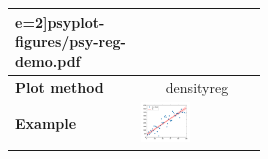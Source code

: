 \documentclass[
11pt, %
english, %
singlespacing, %
headsepline, %
]{MastersDoctoralThesis} %
\begin{document}
\begin{NoHyper}
\begin{refsection}
\begin{subappendices}
\begin{tabular}{l|p{0.25\linewidth}|p{0.25\linewidth}|}
e=2]{psyplot-figures/psy-reg-demo.pdf} \\
			\midrule
			\midrule
			\textbf{Plot method} & \multicolumn{2}{c|}{densityreg} \\
			\hline
			\textbf{Example} & 
				\includegraphics[width=\linewidth, page=3]{psyplot-figures/psy-reg-demo.pdf} &

\end{tabular}
\end{subappendices}
\end{refsection}
\end{NoHyper}
\end{document}
